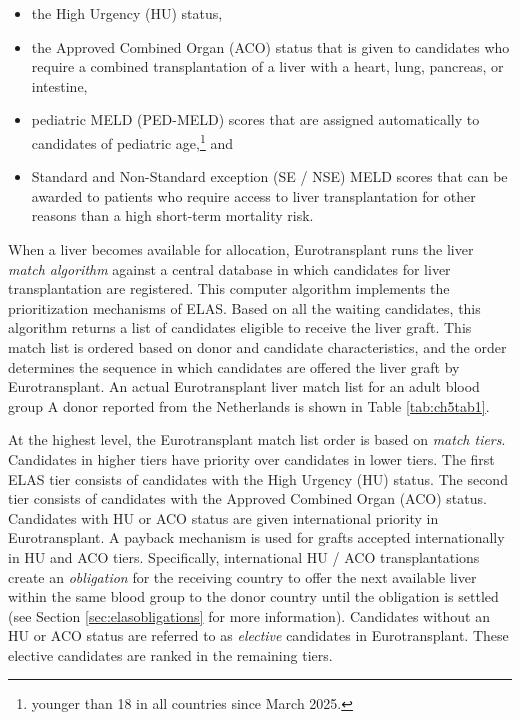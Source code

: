 \documentclass[11pt,twoside,]{book}
\let\rmarkdownfootnote\footnote%
\def\footnote{\protect\rmarkdownfootnote}
\begin{document}
\begin{itemize}
\item
  the High Urgency (HU) status,
\item
  the Approved Combined Organ (ACO) status that is given to
  candidates who require a combined transplantation of a liver with a
  heart, lung, pancreas, or intestine,
\item
  pediatric MELD (PED-MELD) scores that are assigned automatically to candidates
  of pediatric age,\footnote{younger than 18 in all countries since March 2025.} and
\item
  Standard and Non-Standard exception (SE / NSE) MELD scores that can be awarded
  to patients who require access to liver transplantation for other reasons than a high
  short-term mortality risk.
\end{itemize}

When a liver becomes available for allocation, Eurotransplant runs the liver
\emph{match algorithm} against a central database in which candidates for liver
transplantation are registered. This computer algorithm implements the
prioritization mechanisms of ELAS. Based on all the waiting candidates, this
algorithm returns a list of candidates eligible to receive the liver graft.
This match list is ordered based on donor and
candidate characteristics, and the order determines the sequence in
which candidates are offered the liver graft by Eurotransplant. An
actual Eurotransplant liver match list for an adult blood group A donor
reported from the Netherlands is shown in Table \ref{tab:ch5tab1}.

At the highest level, the Eurotransplant match list order is based on
\emph{match tiers}. Candidates in higher tiers have priority over
candidates in lower tiers. The first ELAS tier consists of candidates
with the High Urgency (HU) status. The second tier consists of
candidates with the Approved Combined Organ (ACO) status. Candidates
with HU or ACO status are given international priority in
Eurotransplant. A payback mechanism is used for grafts accepted internationally
in HU and ACO tiers. Specifically, international HU / ACO transplantations create an
\emph{obligation} for the receiving country to offer the next available liver
within the same blood group to the donor country until the obligation is
settled (see Section \ref{sec:elasobligations} for more information).
Candidates without an HU or ACO status are referred to as \emph{elective} candidates
in Eurotransplant. These elective candidates are ranked in the remaining tiers.
\end{document}
